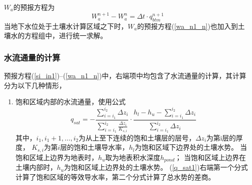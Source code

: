 $W_a$的预报方程为
\begin{equation}\label{wa_n1_n}
W_{a}^{n+1}-W_{a}^{n}=\Delta t \cdot q_{b t m}^{n+1}
\end{equation}
当地下水位处于土壤水计算区域之下时，$W_a$的预报方程(\ref{wa_n1_n})也加入到土壤水的方程组中，进行统一求解。

\subsubsection{水流通量的计算}
预报方程(\ref{si_in1})--(\ref{wa_n1_n})中，右端项中均包含了水流通量的计算，其计算分为以下几种情形，
\begin{enumerate}
    \item 饱和区域内部的水流通量，使用公式
    \begin{equation}\label{q_sat1}
        q_{sat}=-\frac{\sum_{i=i_{1}}^{i_{2}} \Delta z_{i}}{\sum_{i=i_{1}}^{i_{2}} \frac{\Delta z_{i}}{K_{s, i}}}
         \cdot \frac{h_{l}-h_{u}-\sum_{i=i_{1}}^{i_{2}} \Delta z_{i}}{\sum_{i=i_{1}}^{i_{2}} \Delta z_{i}}
        \end{equation}
        其中，$i_1,i_1+1,…,i_2$为从上至下连续的饱和土壤层的层号，$\Delta z_i$为第i层的厚度，
        $K_{s,i}$为第$i$层的饱和土壤导水率，$h_l$为饱和区域下边界处的土壤水势。
        当饱和区域上边界为地表时，$h_u$取为地表积水深度$h_{pond}$；
        当饱和区域上边界在土壤内部时，$h_u$为饱和区域上边界处的土壤水势。
        (\ref{q_sat1})右端第一个分式计算了饱和区域的等效导水率，第二个分式计算了总水势的差商。


\end{enumerate}
